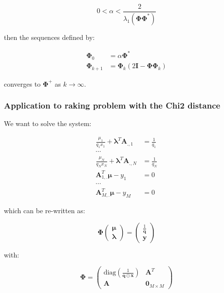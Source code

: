 \documentclass{tex/note}
\begin{document}
\begin{equation*}
0 < \alpha < \frac{2}{\lambda_1 \left( \bm{\Phi} \bm{\Phi}^* \right)}
\end{equation*}

then the sequences defined by:

\begin{align*}
\bm{\Phi}_0 &= \alpha \bm{\Phi}^* \\
\bm{\Phi}_{k + 1} &= \bm{\Phi}_k \left( 2 \bm{I} - \bm{\Phi} \bm{\Phi}_k \right)
\end{align*}

converges to $\bm{\Phi}^+$ as $k \rightarrow \infty$.

\subsubsection{Application to raking problem with the Chi2 distance}

We want to solve the system:

\begin{align*}
\frac{\mu_1}{q_1 x_1} + \bm{\lambda}^T \bm{A}_{.,1} &= \frac{1}{q_1} \\
\cdots & \\
\frac{\mu_N}{q_N x_N} + \bm{\lambda}^T \bm{A}_{.,N} &= \frac{1}{q_N} \\
\bm{A}_{1,.}^T \bm{\mu} - y_1 &= 0 \\
\cdots & \\
\bm{A}_{M,.}^T \bm{\mu} - y_M &= 0
\end{align*}

which can be re-written as:

\begin{equation*}
\bm{\Phi} \begin{pmatrix} \bm{\mu} \\ \bm{\lambda} \end{pmatrix} = \begin{pmatrix} \frac{1}{\bm{q}} \\ \bm{y} \end{pmatrix}
\end{equation*}

with:

\begin{equation*}
\bm{\Phi} = \begin{pmatrix} \text{diag} \left( \frac{1}{\bm{q} \odot \bm{x}} \right) & \bm{A}^T \\ \bm{A} & \bm{0}_{M \times M} \end{pmatrix}
\end{equation*}
\end{document}
